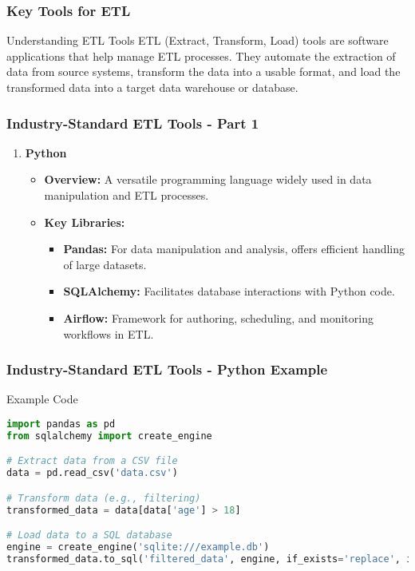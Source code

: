 \documentclass[aspectratio=169]{beamer}
\begin{document}
\begin{frame}
    \frametitle{Key Tools for ETL}
    \begin{block}{Understanding ETL Tools}
        ETL (Extract, Transform, Load) tools are software applications that help manage ETL processes. They automate the extraction of data from source systems, transform the data into a usable format, and load the transformed data into a target data warehouse or database.
    \end{block}
\end{frame}

\begin{frame}
    \frametitle{Industry-Standard ETL Tools - Part 1}
    \begin{enumerate}
        \item \textbf{Python}
        \begin{itemize}
            \item \textbf{Overview:} A versatile programming language widely used in data manipulation and ETL processes.
            \item \textbf{Key Libraries:}
                \begin{itemize}
                    \item \textbf{Pandas:} For data manipulation and analysis, offers efficient handling of large datasets.
                    \item \textbf{SQLAlchemy:} Facilitates database interactions with Python code.
                    \item \textbf{Airflow:} Framework for authoring, scheduling, and monitoring workflows in ETL.
                \end{itemize}
        \end{itemize}
    \end{enumerate}
\end{frame}

\begin{frame}[fragile]
    \frametitle{Industry-Standard ETL Tools - Python Example}
    \begin{block}{Example Code}
    \begin{lstlisting}[language=Python]
import pandas as pd
from sqlalchemy import create_engine

# Extract data from a CSV file
data = pd.read_csv('data.csv')

# Transform data (e.g., filtering)
transformed_data = data[data['age'] > 18]

# Load data to a SQL database
engine = create_engine('sqlite:///example.db')
transformed_data.to_sql('filtered_data', engine, if_exists='replace', index=False)
    \end{lstlisting}
    \end{block}
\end{frame}
\end{document}
